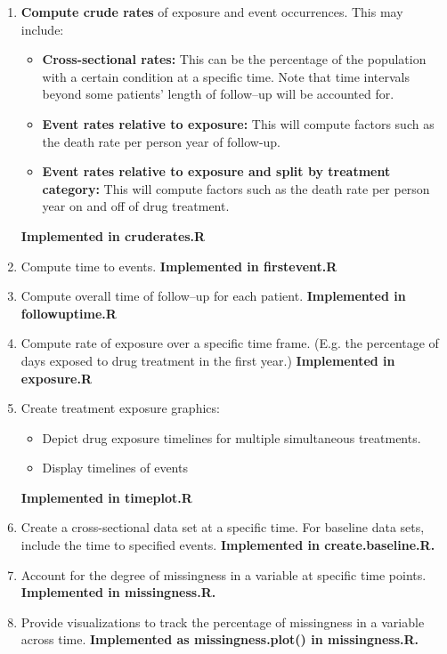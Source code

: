 \documentclass{article}
\begin{document}
\begin{enumerate}
\item \textbf{Compute crude rates} of exposure and event occurrences.  This may include:

\begin{itemize}
\item \textbf{Cross-sectional rates:}  This can be the percentage of the population with a certain condition at a specific time.  Note that time intervals beyond some patients' length of follow--up will be accounted for.

\item \textbf{Event rates relative to exposure:}  This will compute factors such as the death rate per person year of follow-up.

\item \textbf{Event rates relative to exposure and split by treatment category:}  This will compute factors such as the death rate per person year on and off of drug treatment.
\end{itemize}

\textbf{Implemented in cruderates.R}

\item Compute time to events.  \textbf{Implemented in firstevent.R}

\item Compute overall time of follow--up for each patient.  \textbf{Implemented in followuptime.R}

\item Compute rate of exposure over a specific time frame.  (E.g. the percentage of days exposed to drug treatment in the first year.)  \textbf{Implemented in exposure.R}

\item Create treatment exposure graphics:
\begin{itemize}
\item Depict drug exposure timelines for multiple simultaneous treatments.

\item Display timelines of events

\end{itemize}

\textbf{Implemented in timeplot.R}

\item Create a cross-sectional data set at a specific time.  For baseline data sets, include the time to specified events.  \textbf{Implemented in create.baseline.R.}

\item Account for the degree of missingness in a variable at specific time points.  \textbf{Implemented in missingness.R.}

\item Provide visualizations to track the percentage of missingness in a variable across time.  \textbf{Implemented as missingness.plot() in missingness.R.}


\end{enumerate}
\end{document}
